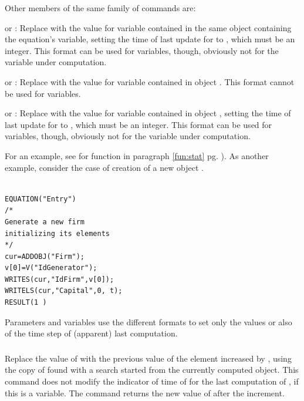 \documentclass [11pt,a4paper] {book}
\begin{document}
Other members of the same family of commands are:

\begin{list}{-}{\itemsep -0.2cm}
\item {} or : Replace with  the value for variable  contained in the same object containing the equation's variable, setting the time of last update for  to , which must be an integer. This format can be used for variables, though, obviously not for the variable under computation.

\item {} or : Replace with  the value for variable  contained in object . This format cannot be used for variables.

\item {} or : Replace with  the value for variable  contained in object , setting the time of last update for  to , which must be an integer. This format can be used for variables, though, obviously not for the variable under computation.

\end{list}

For an example, see for function  in paragraph \ref{fun:stat} pg. \pageref{fun:stat}). As another example, consider the case of creation of a new object . 

 \small
\begin{verbatim}

EQUATION("Entry")
/*
Generate a new firm
initializing its elements
*/
cur=ADDOBJ("Firm");
v[0]=V("IdGenerator");
WRITES(cur,"IdFirm",v[0]);
WRITELS(cur,"Capital",0, t);
RESULT(1 )

\end{verbatim}
\normalsize

Parameters and variables use the different formats to set only the values or also of the time step of (apparent) last computation.

\subsubsection{ }
Replace the value of  with the previous value of the element increased by , using the copy of  found with a search started from the currently computed object. This command does not modify the indicator of time of for the last computation of , if this is a variable. The command returns the new value of  after the increment.
\end{document}
